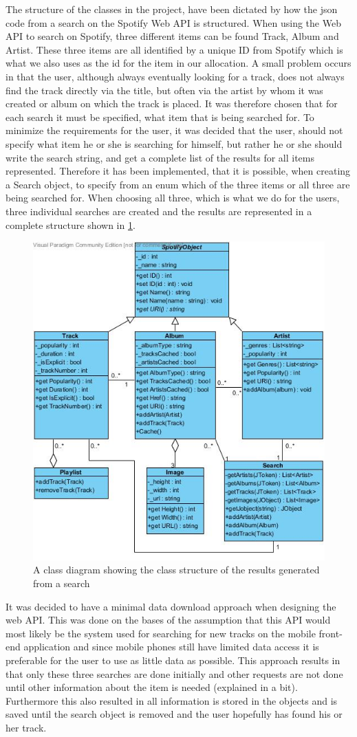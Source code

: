 The structure of the classes in the project, have been dictated by how the json code from a search on the Spotify Web API is structured. When using the Web API to search on Spotify, three different items can be found Track, Album and Artist. These three items are all identified by a unique ID from Spotify which is what we also uses as the id for the item in our allocation.
A small problem occurs in that the user, although always eventually looking for a track, does not always find the track directly via the title, but often via the artist by whom it was created or album on which the track is placed. It was therefore chosen that for each search it must be specified, what item that is being searched for. To minimize the requirements for the user, it was decided that the user, should not specify what item he or she is searching for himself, but rather he or she should write the search string, and get a complete list of the results for all items represented. Therefore it has been implemented, that it is possible, when creating a Search object, to specify from an enum which of the three items or all three are being searched for. When choosing all three, which is what we do for the users, three individual searches are created and the results are represented in a complete structure shown in \cref{fig:WebAPIUML}.

\begin{figure}
  \centering
  \includegraphics[width=0.5\linewidth]{Images/WebAPIUML.jpg}
  \caption{A class diagram showing the class structure of the results generated from a search}
  \label{fig:WebAPIUML}
\end{figure}

It was decided to have a minimal data download approach when designing the web API. This was done on the bases of the assumption that this API would most likely be the system used for searching for new tracks on the mobile front-end application and since mobile phones still have limited data access it is preferable for the user to use as little data as possible. This approach results in that only these three searches are done initially and other requests are not done until other information about the item is needed (explained in a bit). Furthermore this also resulted in all information is stored in the objects and is saved until the search object is removed and the user hopefully has found his or her track.

